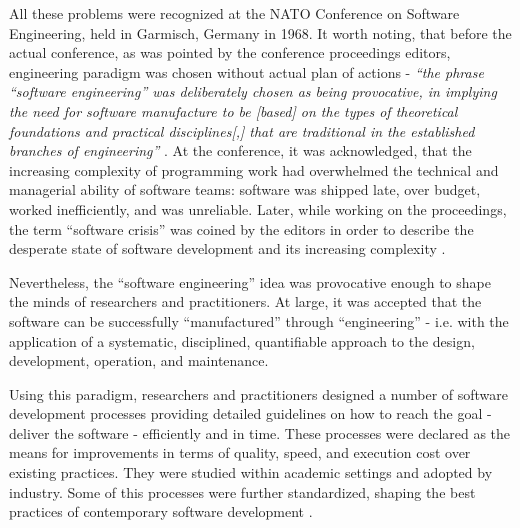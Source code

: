 All these problems were recognized at the NATO Conference on Software Engineering, held in Garmisch,
Germany in 1968. It worth noting, that before the actual conference, as was pointed by the 
conference proceedings editors, engineering paradigm was chosen without actual plan of actions - 
\textit{``the phrase ``software engineering'' was deliberately chosen as being provocative, in implying 
the need for software manufacture to be [based] on the types of theoretical foundations and practical 
disciplines[,] that are traditional in the established branches of engineering''} \cite{citeulike:12787786}.
At the conference, it was acknowledged, that the increasing complexity of programming 
work had overwhelmed the technical and managerial ability of software teams: software was shipped late,
over budget, worked inefficiently, and was unreliable. Later, while working on the proceedings, the term 
``software crisis'' was coined by the editors in order to describe the desperate state of 
software development and its increasing complexity \cite{naur_crisis_68}.

Nevertheless, the ``software engineering'' idea was provocative enough to shape the minds of researchers 
and practitioners. At large, it was accepted that the software can be successfully ``manufactured'' 
through ``engineering'' - i.e. with the application of a systematic, disciplined, quantifiable approach 
to the design, development, operation, and maintenance. 

Using this paradigm, researchers and practitioners designed a number of software development processes 
providing detailed guidelines on how to reach the goal - deliver the software - efficiently and in time. 
These processes were declared as the means for improvements in terms of quality, speed, and execution cost 
over existing practices. They were studied within academic settings and adopted by industry. 
Some of this processes were further standardized, shaping the best practices of contemporary 
software development \cite{citeulike:9962021}. 

